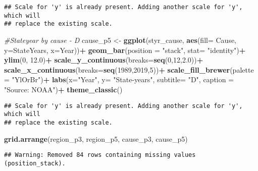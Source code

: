 \documentclass[
]{article}
\newenvironment{Shaded}{\begin{snugshade}}{\end{snugshade}}
\newcommand{\CommentTok}[1]{\textcolor[rgb]{0.56,0.35,0.01}{\textit{#1}}}
\newcommand{\DataTypeTok}[1]{\textcolor[rgb]{0.13,0.29,0.53}{#1}}
\newcommand{\DecValTok}[1]{\textcolor[rgb]{0.00,0.00,0.81}{#1}}
\newcommand{\FloatTok}[1]{\textcolor[rgb]{0.00,0.00,0.81}{#1}}
\newcommand{\KeywordTok}[1]{\textcolor[rgb]{0.13,0.29,0.53}{\textbf{#1}}}
\newcommand{\NormalTok}[1]{#1}
\newcommand{\OperatorTok}[1]{\textcolor[rgb]{0.81,0.36,0.00}{\textbf{#1}}}
\newcommand{\StringTok}[1]{\textcolor[rgb]{0.31,0.60,0.02}{#1}}
\begin{document}
\begin{verbatim}
## Scale for 'y' is already present. Adding another scale for 'y', which will
## replace the existing scale.
\end{verbatim}

\begin{Shaded}
\begin{Highlighting}[]
\CommentTok{#Stateyear by cause - D}
\NormalTok{cause_p5 <-}\StringTok{ }\KeywordTok{ggplot}\NormalTok{(styr_cause, }\KeywordTok{aes}\NormalTok{(}\DataTypeTok{fill=}\NormalTok{ Cause, }\DataTypeTok{y=}\NormalTok{StateYears, }\DataTypeTok{x=}\NormalTok{Year))}\OperatorTok{+}
\StringTok{  }\KeywordTok{geom_bar}\NormalTok{(}\DataTypeTok{position =} \StringTok{"stack"}\NormalTok{, }\DataTypeTok{stat=} \StringTok{"identity"}\NormalTok{)}\OperatorTok{+}
\StringTok{  }\KeywordTok{ylim}\NormalTok{(}\DecValTok{0}\NormalTok{, }\FloatTok{12.0}\NormalTok{)}\OperatorTok{+}
\StringTok{  }\KeywordTok{scale_y_continuous}\NormalTok{(}\DataTypeTok{breaks=}\KeywordTok{seq}\NormalTok{(}\DecValTok{0}\NormalTok{,}\DecValTok{12}\NormalTok{,}\FloatTok{2.0}\NormalTok{))}\OperatorTok{+}
\StringTok{  }\KeywordTok{scale_x_continuous}\NormalTok{(}\DataTypeTok{breaks=}\KeywordTok{seq}\NormalTok{(}\DecValTok{1989}\NormalTok{,}\DecValTok{2019}\NormalTok{,}\DecValTok{5}\NormalTok{))}\OperatorTok{+}
\StringTok{  }\KeywordTok{scale_fill_brewer}\NormalTok{(}\DataTypeTok{palette =} \StringTok{"YlOrBr"}\NormalTok{)}\OperatorTok{+}
\StringTok{  }\KeywordTok{labs}\NormalTok{(}\DataTypeTok{x=}\StringTok{"Year"}\NormalTok{, }\DataTypeTok{y=} \StringTok{"State-years"}\NormalTok{, }\DataTypeTok{subtitle=} \StringTok{"D"}\NormalTok{, }\DataTypeTok{caption =} \StringTok{"Source: NOAA"}\NormalTok{)}\OperatorTok{+}
\StringTok{  }\KeywordTok{theme_classic}\NormalTok{()}
\end{Highlighting}
\end{Shaded}

\begin{verbatim}
## Scale for 'y' is already present. Adding another scale for 'y', which will
## replace the existing scale.
\end{verbatim}

\begin{Shaded}
\begin{Highlighting}[]
\KeywordTok{grid.arrange}\NormalTok{(region_p3, region_p5, cause_p3, cause_p5)}
\end{Highlighting}
\end{Shaded}

\begin{verbatim}
## Warning: Removed 84 rows containing missing values (position_stack).
\end{verbatim}
\end{document}
